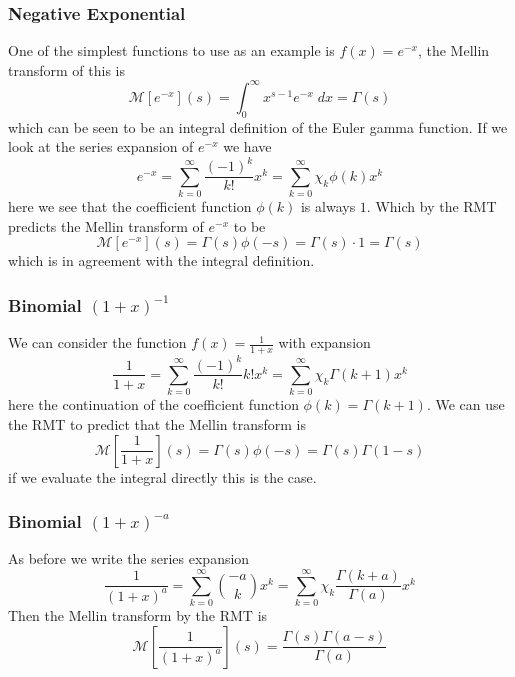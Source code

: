 \documentclass[journal=jcisd8,manuscript=article,layout=onecolumn,pdftex,floatfix,amsmath,amssymb,10pt]{achemso}
\begin{document}
\subsubsection{Negative Exponential}
One of the simplest functions to use as an example is $f(x)=e^{-x}$, the Mellin transform of this is
\begin{equation}
\mathcal{M}[e^{-x}](s) = \int_0^\infty x^{s-1}e^{-x} \; dx = \Gamma(s)
\end{equation}
which can be seen to be an integral definition of the Euler gamma function. If we look at the series expansion of $e^{-x}$ we have
\begin{equation}
e^{-x} = \sum_{k=0}^\infty \frac{(-1)^k}{k!} x^k = \sum_{k=0}^\infty \chi_k \phi(k) x^k
\end{equation}
here we see that the coefficient function $\phi(k)$ is always $1$. Which by the RMT predicts the Mellin transform of $e^{-x}$ to be
\begin{equation}
\mathcal{M}[e^{-x}](s) = \Gamma(s)\phi(-s) = \Gamma(s)\cdot 1 = \Gamma(s)
\end{equation}
which is in agreement with the integral definition.
\subsubsection{Binomial $(1+x)^{-1}$}
We can consider the function $f(x) = \frac{1}{1+x}$ with expansion
\begin{equation}
\frac{1}{1+x} = \sum_{k=0}^\infty \frac{(-1)^k}{k!} k! x^k = \sum_{k=0}^\infty \chi_k \Gamma(k+1) x^k
\end{equation}
here the continuation of the coefficient function $\phi(k) = \Gamma(k+1)$. We can use the RMT to predict that the Mellin transform is
\begin{equation}
\mathcal{M}\left[\frac{1}{1+x}\right](s) = \Gamma(s)\phi(-s) = \Gamma(s)\Gamma(1-s)
\end{equation}
if we evaluate the integral directly this is the case.
\subsubsection{Binomial $(1+x)^{-a}$}
As before we write the series expansion
\begin{equation}
\frac{1}{(1+x)^a} = \sum_{k=0}^\infty \binom{-a}{k} x^k = \sum_{k=0}^\infty \chi_k \frac{\Gamma(k+a)}{\Gamma(a)} x^k
\end{equation}
Then the Mellin transform by the RMT is 
\begin{equation}
\mathcal{M}\left[\frac{1}{(1+x)^a}\right](s) = \frac{\Gamma(s)\Gamma(a-s)}{\Gamma(a)}
\end{equation}
\end{document}
